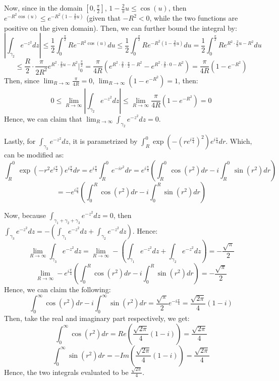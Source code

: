\documentclass{article}
\begin{document}
Now, since in the domain $[0,\frac{\pi}{2}]$, $1-\frac{2}{\pi}u \leq \cos(u)$, then $e^{-R^2\cos(u)}\leq e^{-R^2(1-\frac{2}{\pi}u)}$ (given that $-R^2<0$, while the two functions are positive on the given domain).
Then, we can further bound the integral by:
$$\left|\int_{\gamma_2}e^{-z^2}dz\right|\leq \frac{1}{2}\int_{0}^{\frac{\pi}{2}}Re^{-R^2\cos(u)}du \leq \frac{1}{2}\int_{0}^{\frac{\pi}{2}}Re^{-R^2(1-\frac{2}{\pi}u)}du=\frac{1}{2}\int_{0}^{\frac{\pi}{2}}Re^{R^2\cdot\frac{2}{\pi}u-R^2}du$$
$$\leq \frac{R}{2}\cdot\frac{\pi}{2R^2}e^{R^2\cdot \frac{2}{\pi}u-R^2}\bigg|_{0}^{\frac{\pi}{2}} = \frac{\pi}{4R}(e^{R^2\cdot\frac{2}{\pi}\cdot\frac{\pi}{2}-R^2}-e^{R^2\cdot\frac{2}{\pi}\cdot 0-R^2}) = \frac{\pi}{4R}(1-e^{-R^2})$$
Then, since $\lim_{R\rightarrow\infty}\frac{\pi}{4R}=0$, $\lim_{R\rightarrow\infty}(1-e^{-R^2})=1$, then:
$$0\leq \lim_{R\rightarrow\infty}\left|\int_{\gamma_2}e^{-z^2}dz\right|\leq \lim_{R\rightarrow\infty} \frac{\pi}{4R}(1-e^{-R^2})=0$$
Hence, we can claim that $\lim_{R\rightarrow\infty}\int_{\gamma_2}e^{-z^2}dz = 0$.

\hfil

Lastly, for $\int_{\gamma_3}e^{-z^2}dz$, it is parametrized by $\int_{R}^{0}\exp(-(re^{i\frac{\pi}{4}})^2)e^{i\frac{\pi}{4}}dr$. Which, can be modified as:
$$\int_{R}^{0}\exp(-r^2e^{i\frac{\pi}{2}})e^{i\frac{\pi}{4}}dr = e^{i\frac{\pi}{4}}\int_{R}^{0}e^{-ir^2}dr = e^{i\frac{\pi}{4}}\left(\int_{R}^{0}\cos(r^2)dr - i\int_{R}^{0}\sin(r^2)dr\right)$$
$$=-e^{i\frac{\pi}{4}}\left(\int_{0}^{R}\cos(r^2)dr - i\int_{0}^{R}\sin(r^2)dr\right)$$

Now, because $\int_{\gamma_1+\gamma_2+\gamma_3}e^{-z^2}dz=0$, then $\int_{\gamma_3}e^{-z^2}dz = -(\int_{\gamma_1}e^{-z^2}dz+\int_{\gamma_2}e^{-z^2}dz)$. Hence:
$$\lim_{R\rightarrow\infty}\int_{\gamma_3}e^{-z^2}dz = \lim_{R\rightarrow\infty}-\left(\int_{\gamma_1}e^{-z^2}dz+\int_{\gamma_2}e^{-z^2}dz\right) = -\frac{\sqrt{\pi}}{2}$$
$$\lim_{R\rightarrow\infty}-e^{i\frac{\pi}{4}}\left(\int_{0}^{R}\cos(r^2)dr - i\int_{0}^{R}\sin(r^2)dr\right) = -\frac{\sqrt{\pi}}{2}$$
Hence, we can claim the following:
$$\int_{0}^{\infty}\cos(r^2)dr - i\int_{0}^{\infty}\sin(r^2)dr = \frac{\sqrt{\pi}}{2}e^{-i\frac{\pi}{4}} = \frac{\sqrt{2\pi}}{4}(1-i)$$
Then, take the real and imaginary part respectively, we get:
$$\int_{0}^{\infty}\cos(r^2)dr = Re\left(\frac{\sqrt{2\pi}}{4}(1-i)\right)=\frac{\sqrt{2\pi}}{4}$$
$$\int_{0}^{\infty}\sin(r^2)dr = -Im\left(\frac{\sqrt{2\pi}}{4}(1-i)\right)=\frac{\sqrt{2\pi}}{4}$$
Hence, the two integrals evaluated to be $\frac{\sqrt{2\pi}}{4}$.
\end{document}
